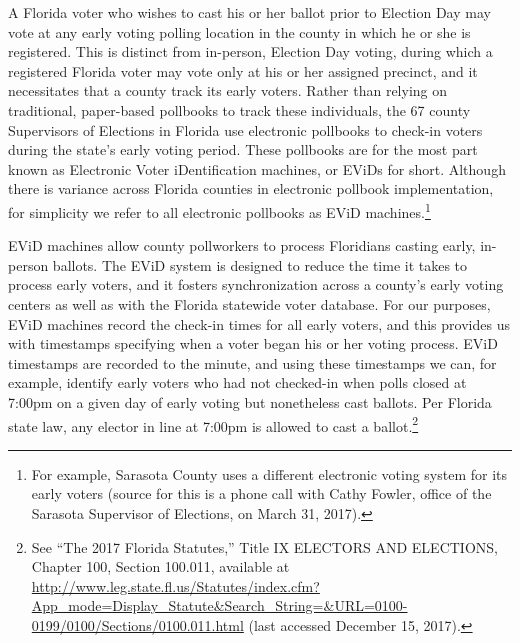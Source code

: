 \documentclass[12pt,titlepage]{article}
\begin{document}

A Florida voter who wishes to cast his or her ballot prior to Election
Day may vote at any early voting polling location in the county in
which he or she is registered. This is distinct from in-person,
Election Day voting, during which a registered Florida voter may vote
only at his or her assigned precinct, and it necessitates that a
county track its early voters. Rather than relying on traditional,
paper-based pollbooks to track these individuals, the 67 county
Supervisors of Elections in Florida use electronic pollbooks to
check-in voters during the state's early voting period. These
pollbooks are for the most part known as Electronic Voter
iDentification machines, or EViDs for short. Although there is
variance across Florida counties in electronic pollbook
implementation, for simplicity we refer to all electronic pollbooks as
EViD machines.\footnote{For example, Sarasota
  County uses
  a different electronic voting system for its early voters (source
  for this is a phone call with Cathy Fowler, office of the Sarasota
  Supervisor of Elections, on March 31, 2017).}


EViD machines allow county pollworkers to process Floridians casting
early, in-person ballots. The EViD system is designed to reduce the
time it takes to process early voters, and it fosters synchronization
across a county's early voting centers as well as with the Florida
statewide voter database. For our purposes, EViD machines record the
check-in times for all early voters, and this provides us with
\mbox{timestamps} specifying when a voter began his or her voting
process. EViD timestamps are recorded to the minute, and using these
timestamps we can, for example, identify early voters who had not
checked-in when polls closed at 7:00pm on a given day of early voting
but nonetheless cast ballots. Per Florida state law, any elector in
line at 7:00pm is allowed to cast a ballot.\footnote{See
  ``The 2017 Florida Statutes,'' Title IX ELECTORS AND ELECTIONS,
  Chapter 100, Section 100.011, available at
  \url{http://www.leg.state.fl.us/Statutes/index.cfm?App\_mode=Display\_Statute\&Search\_String=\&URL=0100-0199/0100/Sections/0100.011.html}
  (last accessed December 15, 2017).}
\end{document}
